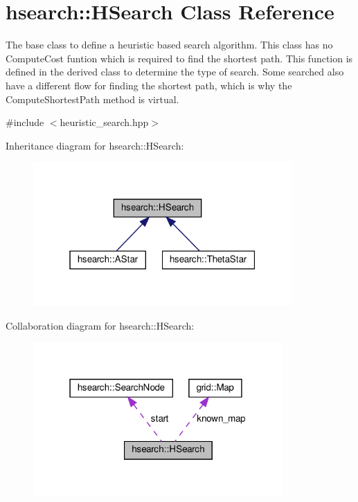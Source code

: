 \hypertarget{classhsearch_1_1HSearch}{}\section{hsearch\+:\+:H\+Search Class Reference}
\label{classhsearch_1_1HSearch}


The base class to define a heuristic based search algorithm. This class has no Compute\+Cost funtion which is required to find the shortest path. This function is defined in the derived class to determine the type of search. Some searched also have a different flow for finding the shortest path, which is why the Compute\+Shortest\+Path method is virtual.  




{\ttfamily \#include $<$heuristic\+\_\+search.\+hpp$>$}



Inheritance diagram for hsearch\+:\+:H\+Search\+:\nopagebreak
\begin{figure}[H]
\begin{center}
\leavevmode
\includegraphics[width=280pt]{d3/dff/classhsearch_1_1HSearch__inherit__graph}
\end{center}
\end{figure}


Collaboration diagram for hsearch\+:\+:H\+Search\+:\nopagebreak
\begin{figure}[H]
\begin{center}
\leavevmode
\includegraphics[width=271pt]{df/d1e/classhsearch_1_1HSearch__coll__graph}
\end{center}
\end{figure}
